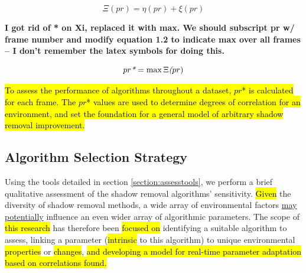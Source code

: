 \documentclass[12pt]{report}
\newcommand{\comment}[1]
           {\par {\bfseries \color{blue} #1 \par}}
\begin{document}
\begin{equation}
\Xi(pr) = \eta(pr) + \xi(pr)
\label{eqn:score}
\end{equation}

\comment{I got rid of * on Xi, replaced it with max.  We should subscript pr w/ frame number and modify equation 1.2 to indicate max over all frames -- I don't remember the latex symbols for doing this.}
\begin{equation}
pr\emph{*} = \max{\Xi\emph(pr)}
\end{equation}

\hl{To assess the performance of algorithms throughout a dataset, $pr$* is calculated for each frame. The $pr$* values are used to determine degrees of correlation for an environment, and set the foundation for a general model of arbitrary shadow removal improvement.}

\subsection{Algorithm Selection Strategy} \label{section:selectalgorithm}

Using the tools detailed in section \ref{section:assesstools}, we perform a brief qualitative assessment of the shadow removal algorithms' sensitivity. \hl{Given} the diversity of shadow removal methods, a wide array of environmental factors \underline{may potentially} influence an even wider array of algorithmic parameters. The scope of \hl{this research} has therefore been \hl{focused on} identifying a suitable algorithm to assess, linking a parameter (\hl{intrinsic} to this algorithm) to unique environmental \hl{properties} or \hl{changes}, \hl{and developing a model for real-time parameter adaptation based on correlations found.}

\end{document}

